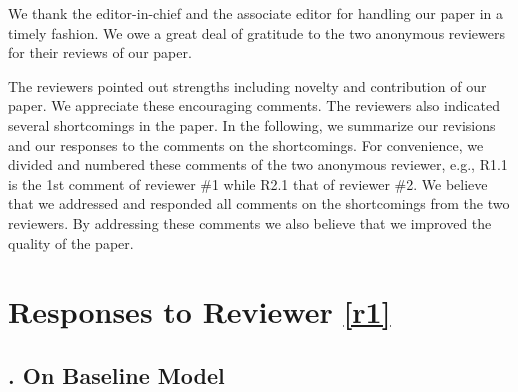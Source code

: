 \noindent 
We thank the editor-in-chief and the associate editor for handling our paper in
a timely fashion. We owe a great deal of gratitude to the two anonymous
reviewers for their reviews of our paper. 
    
The reviewers pointed out strengths including novelty and contribution of our
paper.  We appreciate these encouraging comments.  The reviewers also indicated
several shortcomings in the paper.  In the following, we summarize our
revisions and our responses to the comments on the shortcomings.  For
convenience, we divided and numbered these comments of the two anonymous
reviewer, e.g., R1.1 is the 1st comment of reviewer \#1 while R2.1 that of
reviewer \#2.  We believe that we addressed and responded all comments on the
shortcomings from the two reviewers.  By addressing these comments we also
believe that we improved the quality of the paper. 




\section{Responses to Reviewer \ref{r1}}


\subsection{. On Baseline Model}

